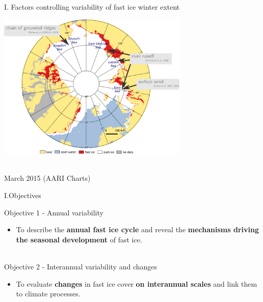 \documentclass[8pt]{beamer}
\newcommand\Fontvi{\fontsize{6}{7.2}\selectfont}
\begin{document}
\setwatermark{\fontsize{125pt}{125pt}\selectfont{}}
\begin{frame}[fragile]{I. Factors controlling variability of fast ice winter extent}
	\begin{center}
		\includegraphics[height=7cm]{./img/ArcticSI_Mar2015_FI_know.pdf}\\
	\end{center}
	~\\
	\Fontvi
	17 March 2015 (AARI Charts)
\end{frame}

\setwatermark{\fontsize{125pt}{125pt}\selectfont{}}
\begin{frame}[fragile]{I.Objectives}
		
	Objective 1 -  Annual variability
		\begin{itemize}
			\item To describe the \textbf{annual fast ice cycle} and 
		reveal the \textbf{mechanisms driving the seasonal development} of fast ice.\\~\\
		\end{itemize}
	Objective 2 - Interannual variability and changes
		\begin{itemize}
			\item To evaluate \textbf{changes} in fast ice cover \textbf{on interannual scales} and 
		link them to climate processes.
		\end{itemize}

\end{frame}
\end{document}
